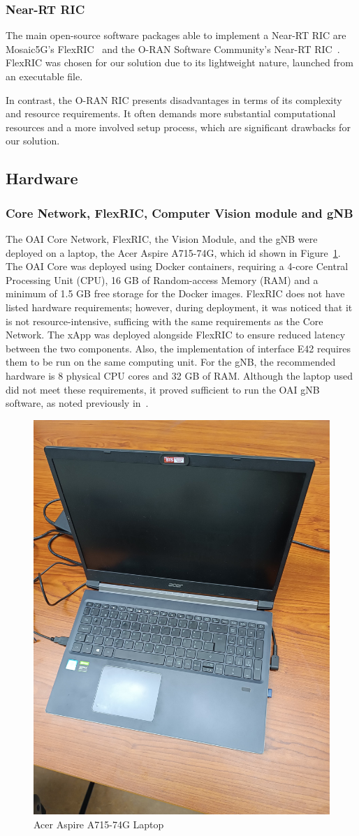 \subsubsection{Near-RT RIC}
The main open-source software packages able to implement a Near-RT RIC are Mosaic5G’s FlexRIC~\cite{flexric} and the O-RAN Software Community’s Near-RT RIC~\cite{oran-sc}.
FlexRIC was chosen for our solution due to its lightweight nature, launched from an executable file.

In contrast, the O-RAN RIC presents disadvantages in terms of its complexity and resource requirements.
It often demands more substantial computational resources and a more involved setup process, which are significant drawbacks for our solution.

\subsection{Hardware}\label{subsec:hardware}


\subsubsection{Core Network, FlexRIC, Computer Vision module and gNB}
The OAI Core Network, FlexRIC, the Vision Module, and the gNB were deployed on a laptop, the Acer Aspire A715-74G, which id shown in Figure~\ref{fig:computer_acer}.
The OAI Core was deployed using Docker containers, requiring a 4-core Central Processing Unit (CPU), 16 GB of Random-access Memory (RAM) and a minimum of 1.5 GB free storage for the Docker images.
FlexRIC does not have listed hardware requirements; however, during deployment, it was noticed that it is not resource-intensive, sufficing with the same requirements as the Core Network.
The xApp was deployed alongside FlexRIC to ensure reduced latency between the two components.
Also,  the implementation of interface E42 requires them to be run on the same computing unit.
For the gNB, the recommended hardware is 8 physical CPU cores and 32 GB of RAM\@.
Although the laptop used did not meet these requirements, it proved sufficient to run the OAI gNB software, as noted previously in~\cite{queiros2023autonomous}.

\begin{figure}[H]
    \centering
    \includegraphics[width=0.3\linewidth]{figures/acer}
    \caption{Acer Aspire A715-74G Laptop}
    \label{fig:computer_acer}
\end{figure}

